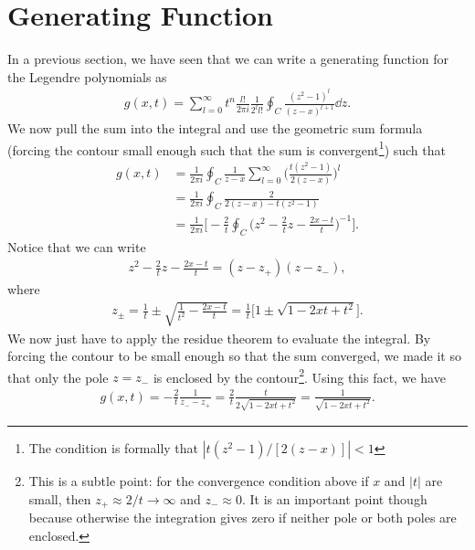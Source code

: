 \section{Generating Function}

In a previous section, we have seen that we can write a generating function for the Legendre polynomials as
\begin{eqnarray}
    g(x,t) = \sum_{l=0}^{\infty} t^{n} \frac{l!}{2 \pi i} \frac{1}{2^{l} l!} \oint_{C} \frac{(z^2 - 1)^{l}}{(z - x)^{l+1}} \dd{z}
.\end{eqnarray}
We now pull the sum into the integral and use the geometric sum formula (forcing the contour small enough such that the sum is convergent\footnote{The condition is formally that $| t(z^2 - 1)/[2(z-x)] | < 1$}) such that
\begin{align}
    g(x,t) &= \frac{1}{2 \pi i} \oint_{C} \frac{1}{z-x} \sum_{l=0}^{\infty} \Bigg( \frac{t(z^2 - 1)}{2(z-x)} \Bigg)^{l} \nonumber \\
    &= \frac{1}{2 \pi i} \oint_{C} \frac{2}{2(z-x) - t(z^2 - 1)} \nonumber \\
    &= \frac{1}{2 \pi i} \Bigg[- \frac{2}{t} \oint_{C} \Big( z^2 - \frac{2}{t} z - \frac{2x - t}{t} \Big)^{-1} \Bigg]
.\end{align}
Notice that we can write
\begin{eqnarray}
    z^2 - \frac{2}{t} z - \frac{2x - t}{t} = (z - z_{+}) (z - z_{-})
,\end{eqnarray}
where
\begin{eqnarray}
    z_{\pm} = \frac{1}{t} \pm \sqrt{ \frac{1}{t^2} - \frac{2x - t}{t} } = \frac{1}{t} \Big[ 1 \pm \sqrt{1 - 2xt + t^2} \Big]
.\end{eqnarray}
We now just have to apply the residue theorem to evaluate the integral.
By forcing the contour to be small enough so that the sum converged, we made it so that only the pole $z = z_{-}$ is enclosed by the contour\footnote{This is a subtle point: for the convergence condition above if $x$ and $|t|$ are small, then $z_{+} \approx 2/t \rightarrow \infty$ and $z_{-} \approx 0$. It is an important point though because otherwise the integration gives zero if neither pole or both poles are enclosed.}.
Using this fact, we have
\begin{eqnarray}
    \label{eq:legendre-gen}
    g(x,t) = -\frac{2}{t} \frac{1}{z_{-} - z_{+}} = \frac{2}{t} \frac{t}{2\sqrt{1 - 2xt + t^2}} = \frac{1}{\sqrt{1 - 2xt + t^2}}
.\end{eqnarray}

